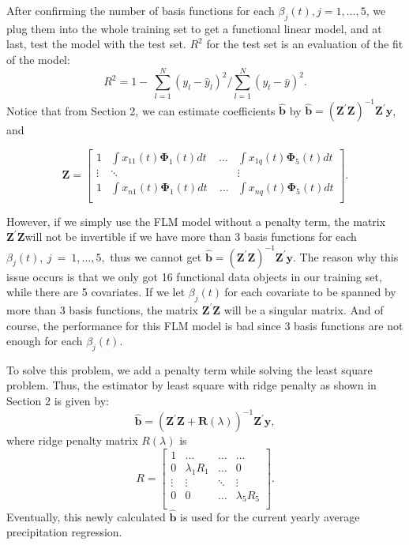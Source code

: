 After confirming the number of basis functions for each $\beta_j(t), j =1,\dots,5$, we plug them into the whole training set to get a functional linear model, and at last, test the model with the test set. $R^2$ for the test set is an evaluation of the fit of the model:\\
$$R^2=1-\ \sum_{l=1}^{N}{\left(y_l-{\hat{y}}_l\right)^2/\sum_{l=1}^{N}\left(y_l-\bar{y}\right)^2}.$$
Notice that from Section 2, we can estimate coefficients $\hat{\bm{b}}$ by $\hat{\bm{b}}=\left(\bm{Z}^\prime\bm{Z}\right)^{-1}\bm{Z}^\prime\bm{y}$, and 

$$\mathbf{Z}=\left[\begin{matrix}{1}&\int{x_{11}\left(t\right)\mathbf{\Phi}_{1}\left(t\right)dt}\ \ \ \ \ \ldots&\int{x_{1q}\left(t\right)\mathbf{\Phi}_{5}\left(t\right)dt}\\\vdots&\ddots\ &\vdots\\{1}&\int{x_{n1}\left(t\right)\mathbf{\Phi}_{1}\left(t\right)dt\ }\ \ \ \ \ldots&\int{x_{nq}\left(t\right)\mathbf{\Phi}_{5}\left(t\right)dt}\\\end{matrix}\right].$$

However, if we simply use the FLM model without a penalty term, the matrix $\bm{Z}^\prime\bm{Z} $will not be invertible if we have more than 3 basis functions for each $ \beta_j\left(t\right),\ j\ =\ 1,\dots,5, $ thus we cannot get $\hat{\bm{b}}=\left(\bm{Z}^\prime\bm{Z}\right)^{-1}\bm{Z}^\prime\bm{y}.$ The reason why this issue occurs is that we only got 16 functional data objects in our training set, while there are 5 covariates. If we let $\beta_j\left(t\right)\ $for each covariate to be spanned by more than 3 basis functions, the matrix $\bm{Z}^\prime\bm{Z}$ will be a singular matrix. And of course, the performance for this FLM model is bad since 3 basis functions are not enough for each $\beta_j\left(t\right)$.

To solve this problem, we add a penalty term while solving the least square problem. Thus, the estimator by least square with ridge penalty as shown in Section 2 is given by: 
$$\hat{\bm b}=\left(\bm{Z}^\prime\bm{Z}+\bm{R}(\lambda)\right)^{-1}\bm{Z}^\prime\bm{y},$$
where ridge penalty matrix $R(\lambda)$ is 
$$R=\left[\begin{matrix}1&\ldots&\ldots&\ldots\\0&\lambda_1R_1&\ldots&0\\\vdots&\vdots&\ddots&\vdots\\0&0&\ldots&\lambda_5R_5\\\end{matrix}\right].$$
Eventually, this newly calculated $\hat{\bm b}$ is used for the current yearly average precipitation regression.

